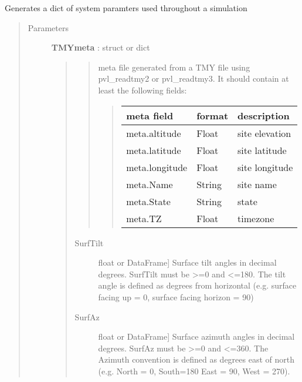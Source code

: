 \documentclass[letterpaper,10pt,english]{sphinxmanual}
\begin{document}
\begin{fulllineitems}
\label{stubs/pvlib.pvl_systemdef:pvlib.pvl_systemdef}
Generates a dict of system paramters used throughout a simulation
\begin{quote}\begin{description}
\item[{Parameters}] \leavevmode
\textbf{TMYmeta} : struct or dict
\begin{quote}
\begin{quote}

meta file generated from a TMY file using pvl\_readtmy2 or pvl\_readtmy3.
It should contain at least the following fields:
\begin{quote}

\begin{tabulary}{\linewidth}{|L|L|L|}
\hline
\textsf{\relax 
meta field
} & \textsf{\relax 
format
} & \textsf{\relax 
description
}\\
\hline
meta.altitude
 & 
Float
 & 
site elevation
\\

meta.latitude
 & 
Float
 & 
site latitude
\\

meta.longitude
 & 
Float
 & 
site longitude
\\

meta.Name
 & 
String
 & 
site name
\\

meta.State
 & 
String
 & 
state
\\

meta.TZ
 & 
Float
 & 
timezone
\\
\hline\end{tabulary}

\end{quote}
\end{quote}
\begin{description}
\item[{SurfTilt}] \leavevmode{[}float or DataFrame{]}
Surface tilt angles in decimal degrees.
SurfTilt must be \textgreater{}=0 and \textless{}=180. The tilt angle is defined as
degrees from horizontal (e.g. surface facing up = 0, surface facing
horizon = 90)

\item[{SurfAz}] \leavevmode{[}float or DataFrame{]}
Surface azimuth angles in decimal degrees.
SurfAz must be \textgreater{}=0 and \textless{}=360. The Azimuth convention is defined
as degrees east of north (e.g. North = 0, South=180 East = 90, West = 270).


\end{description}
\end{quote}
\end{description}
\end{quote}
\end{fulllineitems}
\end{document}
